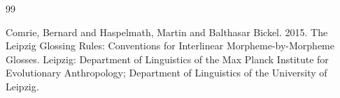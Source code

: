 \documentclass[ruler]{CUP-JNL-LIN}%
\begin{document}
\begin{Backmatter}
\begin{thebibliography}{99}

{Comrie, Bernard and Haspelmath, Martin and {Balthasar Bickel}}. 2015. The Leipzig Glossing Rules: Conventions for Interlinear Morpheme-by-Morpheme Glosses. Leipzig: Department of Linguistics of the Max Planck Institute for Evolutionary Anthropology; Department of Linguistics of the University of Leipzig.




\end{thebibliography}
\end{Backmatter}
\end{document}
